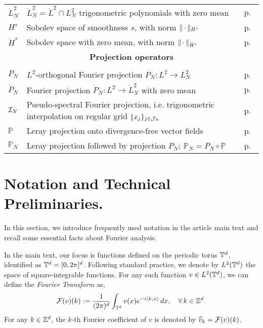 \documentclass[reqno,a4paper]{amsart}
\begin{document}
\begin{center}
\begin{tabular}{l p{}  r}
$\dot{L}^2_N$ & $\dot{L}^2_N = \dot{L}^2\cap L^2_N$ trigonometric polynomials  with zero mean & p.~\pageref{eq:dotHs} \\
$H^s$ & Sobolev space of smoothness $s$, with norm $\Vert {\,\cdot\,} \Vert_{H^s}$ & p.~\pageref{eq:Hs} \\
$\dot{H}^s$ & Sobolev space with zero mean, with norm $\Vert {\,\cdot\,} \Vert_{\dot{H}^s}$ & p.~\pageref{eq:dotHs} \\[5pt]
\multicolumn{3}{c}{\textbf{Projection operators}} \\
\hline && \\
$P_N$ & $L^2$-orthogonal Fourier projection $P_N: L^2 \to L^2_N$ & p.~\pageref{eq:proj} \\
$\dot{P}_N$ & Fourier projection $\dot{P}_N: {L}^2 \to \dot{L}^2_N$ with zero mean & p.~\pageref{eq:dotproj} \\
$\mathcal{I}_N$ & Pseudo-spectral Fourier projection, i.e. trigonometric interpolation on regular grid $\{x_j\}_{j\in\mathcal{J}_N}$  & p.~\pageref{eq:pproj} \\
$\mathbb{P}$ & Leray projection onto divergence-free vector fields & p.~\pageref{eq:leray} \\
$\mathbb{P}_N$ & Leray projection followed by projection $P_N$; $\mathbb{P}_N = P_N \circ \mathbb{P}$ & p.~\pageref{eq:lerayn}
\end{tabular}

\end{center}


\section{Notation and Technical Preliminaries.}
\label{app:notn}
In this section, we introduce frequently used notation in the article main text and recall some essential facts about Fourier analysis. 

In the main text, our focus is functions defined on the periodic torus $\mathbb{T}^d$, identified as $\mathbb{T}^d = [0,2\pi]^d$. Following standard practice, we  denote by $L^2(\mathbb{T}^d)$ the space of square-integrable functions. For any such function $v \in L^2(\mathbb{T}^d)$, we can define the \emph{Fourier Transform} as, 
\begin{equation}
    \label{eq:ft}
\mathcal{F}(v)(k)
:=
\frac1{(2\pi)^d}
\int_{\mathbb{T}^d}
v(x) e^{-i\langle k, x\rangle} \, dx,
\quad
\forall \, k\in \mathbb{Z}^d.
\end{equation}
For any $k\in \mathbb{Z}^d$, the $k$-th Fourier coefficient of $v$ is denoted by $\widehat{v}_k =\mathcal{F}(v)(k)$. 
\end{document}
